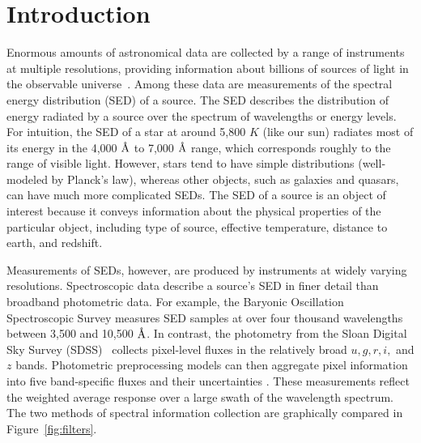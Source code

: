 \documentclass{article}
\newcommand{\angstrom}{\textup{\AA}}
\begin{document}
\section{Introduction}
Enormous amounts of astronomical data are collected by a range of instruments at multiple resolutions, providing information about billions of sources of light in the observable universe~\cite{kent1994sdss, martin2005galex}.  
Among these data are measurements of the spectral energy distribution (SED) of a source.  
The SED describes the distribution of energy radiated by a source over the spectrum of wavelengths or energy levels.   
For intuition, the SED of a star at around 5,800 $K$ (like our sun) radiates most of its energy in the 4,000 $\angstrom$ to 7,000 $\angstrom$ range, which corresponds roughly to the range of visible light.  
However, stars tend to have simple distributions (well-modeled by Planck's law), whereas other objects, such as galaxies and quasars, can have much more complicated SEDs.  
The SED of a source is an object of interest because it conveys information about the physical properties of the particular object, including type of source, effective temperature, distance to earth, and redshift. 

Measurements of SEDs, however, are produced by instruments at widely varying resolutions.  
Spectroscopic data describe a source's SED in finer detail than broadband photometric data.  For example, the Baryonic Oscillation Spectroscopic Survey \cite{dawson2013baryon} measures SED samples at over four thousand wavelengths between 3,500 and 10,500 $\angstrom$.
In contrast, the photometry from the Sloan Digital Sky Survey (SDSS)~\cite{kent1994sdss} collects pixel-level fluxes in the relatively broad $u,g,r,i,$ and $z$ bands.  
Photometric preprocessing models can then aggregate pixel information into five band-specific fluxes and their uncertainties \cite{luptonsdss}.  
These measurements reflect the weighted average response over a large swath of the wavelength spectrum. 
The two methods of spectral information collection are graphically compared in Figure~\ref{fig:filters}. 
\end{document}
